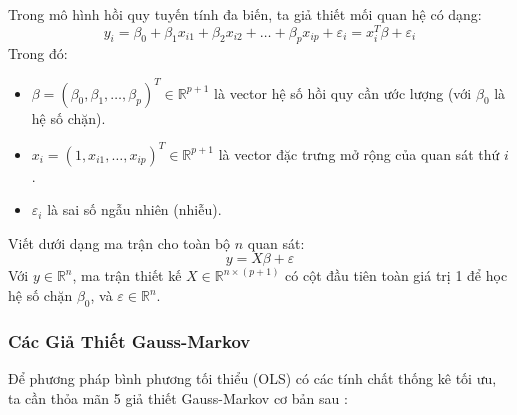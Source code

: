 \documentclass[12pt,a4paper]{article}
\begin{document}
Trong mô hình hồi quy tuyến tính đa biến, ta giả thiết mối quan hệ có dạng:
\begin{equation}
    y_i = \beta_0 + \beta_1 x_{i1} + \beta_2 x_{i2} + \dots + \beta_p x_{ip} + \varepsilon_i = x_i^T \beta + \varepsilon_i
\end{equation}
Trong đó:
\begin{itemize}
    \item $\beta = (\beta_0, \beta_1, \dots, \beta_p)^T \in \mathbb{R}^{p+1}$ là vector hệ số hồi quy cần ước lượng (với $\beta_0$ là hệ số chặn).
    \item $x_i = (1, x_{i1}, \dots, x_{ip})^T \in \mathbb{R}^{p+1}$ là vector đặc trưng mở rộng của quan sát thứ $i$.
    \item $\varepsilon_i$ là sai số ngẫu nhiên (nhiễu).
\end{itemize}

Viết dưới dạng ma trận cho toàn bộ $n$ quan sát:
\begin{equation}
    y = X\beta + \varepsilon
\end{equation}
Với $y \in \mathbb{R}^n$, ma trận thiết kế $X \in \mathbb{R}^{n \times (p+1)}$ có cột đầu tiên toàn giá trị 1 để học hệ số chặn $\beta_0$, và $\varepsilon \in \mathbb{R}^n$.

\subsubsection{Các Giả Thiết Gauss-Markov}
Để phương pháp bình phương tối thiểu (OLS) có các tính chất thống kê tối ưu, ta cần thỏa mãn 5 giả thiết Gauss-Markov cơ bản sau \cite{hastie}:
\end{document}
